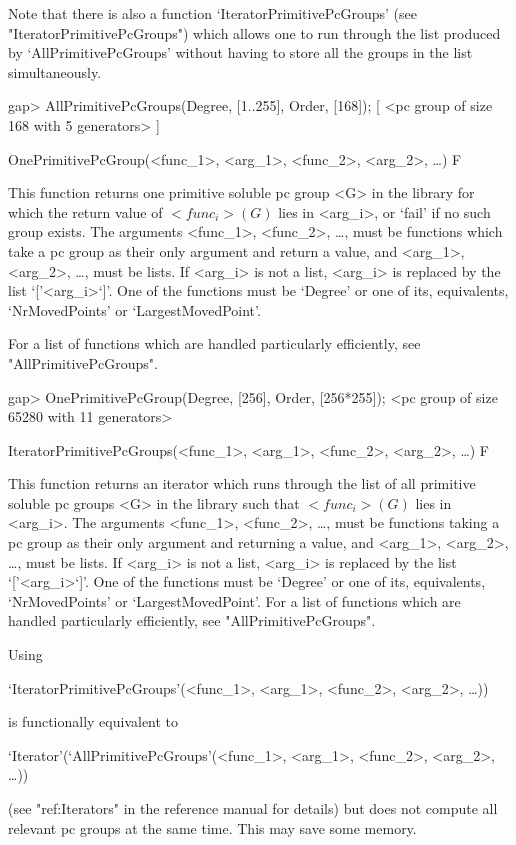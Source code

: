 Note that there is also a function `IteratorPrimitivePcGroups' (see
"IteratorPrimitivePcGroups") which allows one to run through the list produced by
`AllPrimitivePcGroups' without having to store all the groups in the list
simultaneously.

\beginexample
gap> AllPrimitivePcGroups(Degree, [1..255], Order, [168]);
[ <pc group of size 168 with 5 generators> ]
\endexample


\>OnePrimitivePcGroup(<func_1>, <arg_1>, <func_2>, <arg_2>, \dots) F

This function returns one primitive soluble pc
group <G> in the  {\IRREDSOL} library for which the return value of $<func_i>(G)$ lies in
<arg_i>, or `fail' if no such group exists.  The arguments <func_1>, <func_2>, \dots,
must be {\GAP} functions which take a pc group as their only argument and return a
value, and <arg_1>, <arg_2>,
\dots,  must be lists. If <arg_i> is not a list, <arg_i> is replaced by the list
`['<arg_i>`]'. One of the functions must be `Degree' or one of its, equivalents, `NrMovedPoints' or `LargestMovedPoint'.

For a list of functions which are handled particularly efficiently, see
"AllPrimitivePcGroups".

\beginexample
gap> OnePrimitivePcGroup(Degree, [256], Order, [256*255]);
<pc group of size 65280 with 11 generators>
\endexample

\>IteratorPrimitivePcGroups(<func_1>, <arg_1>, <func_2>, <arg_2>, \dots) F

This function returns an iterator which runs through the list of all primitive soluble
pc groups <G> in the  {\IRREDSOL} library such that
$<func_i>(G)$ lies in <arg_i>. The arguments <func_1>, <func_2>, \dots,
must be {\GAP} functions taking a pc group as their only argument and returning 
a value, and <arg_1>, <arg_2>, \dots, 
must be lists. If <arg_i> is not a list, <arg_i> is replaced by the list `['<arg_i>`]'.
One of the functions must be `Degree' or one of its, equivalents, `NrMovedPoints' 
or `LargestMovedPoint'.
For a list of functions which are handled particularly efficiently, see
"AllPrimitivePcGroups".

Using 

`IteratorPrimitivePcGroups'(<func_1>, <arg_1>, <func_2>, <arg_2>, \dots)) 

is functionally equivalent to 

`Iterator'(`AllPrimitivePcGroups'(<func_1>, <arg_1>, <func_2>, <arg_2>, \dots))

(see "ref:Iterators" in the {\GAP} reference manual for details) but does not 
compute all relevant pc groups at the same time. 
This may save some memory. 


